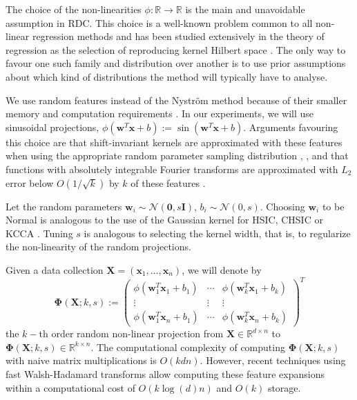 \documentclass{article}
\begin{document}
The choice of the non-linearities $\phi : \mathbb{R} \rightarrow \mathbb{R}$ is
the main and unavoidable assumption in RDC. This choice is a
well-known problem common to all non-linear regression methods and has been
studied extensively in the theory of regression as the selection of reproducing
kernel Hilbert space \cite[]{learningwithkernels}.  The only
way to favour one such family and distribution over another is to use prior
assumptions about which kind of distributions the method will typically have to
analyse. 

We use random features instead of the Nystr\"om method because of their smaller
memory and computation requirements \cite{Le13}.  In our experiments, we will
use sinusoidal projections, $\phi(\bm w^T \bm x +b) := \sin(\bm w^T \bm x +
b)$.  Arguments favouring this choice are that shift-invariant kernels are
approximated with these features when using the appropriate random parameter
sampling distribution \cite{Rahimi08},
\cite[p.~208]{gihman4s:_theor_stoch_proces}
\cite[p.~24]{stein99:_inter_spatial_data}, and that functions with absolutely
integrable Fourier transforms are approximated with $L_2$ error below
$O(1/\sqrt{k})$ by $k$ of these features \cite{Jones92}.

Let the random parameters $\bm w_i \sim \mathcal{N}(\bm 0, s\bm I)$, $b_i \sim
\mathcal{N}(0, s)$. Choosing $\bm w_i$ to be Normal is analogous to the use of
the Gaussian kernel for HSIC, CHSIC or KCCA \cite{Rahimi08}.  Tuning $s$ is
analogous to selecting the kernel width, that is, to regularize the
non-linearity of the random projections.

Given a data collection $\bm X = (\bm x_1, \ldots, \bm x_n)$, we will denote by
\begin{equation}
  \bm \Phi(\bm X; k,s) := 
  \left(
  \begin{array}{ccc}
  \phi(\bm w_1^T \bm x_1+b_1) & \cdots & \phi(\bm w_k^T \bm x_1+b_k)\\
  \vdots & \vdots & \vdots \\
  \phi(\bm w_1^T \bm x_n+b_1) & \cdots & \phi(\bm w_k^T \bm x_n +b_k)
  \end{array}
  \right)^T
\end{equation}
the $k-$th order random non-linear projection from $\bm X \in \mathbb{R}^{d
\times n}$ to $\bm \Phi(\bm X; k, s) \in
\mathbb{R}^{k \times n}$. The computational complexity of computing $\bm
\Phi(\bm X; k, s)$ with naive matrix multiplications is $O(kdn)$. However,
recent techniques using fast Walsh-Hadamard transforms \cite{Le13} allow
computing these feature expansions within a computational cost of
$O(k\log(d)n)$ and $O(k)$ storage.
\end{document}
